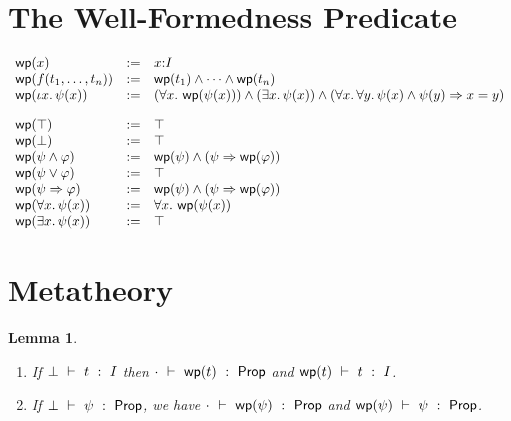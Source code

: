 \documentclass[11pt]{article}
\newtheorem{lemma}{Lemma}
\begin{document}
\section{The Well-Formedness Predicate}


\[
\begin{array}{lll}
  \mathop{\mathsf{wp}}(x) & := & x{:}I\\
  \mathop{\mathsf{wp}}(f({t}_1,\ldots,{t}_{n})) & := & \mathop{\mathsf{wp}}(t_1) \wedge \cdots \wedge \mathop{\mathsf{wp}}(t_n)\\
  \mathop{\mathsf{wp}}(\iota x.\, \psi(x)) & := &
       (\forall x.\, \mathop{\mathsf{wp}}(\psi(x))) \wedge
       (\exists x.\, \psi(x)) \wedge
       (\forall x.\, \forall y.\, \psi(x) \wedge \psi(y) \Rightarrow x=y)\\[10pt]

  \mathop{\mathsf{wp}}(\top) & := & \top\\
  \mathop{\mathsf{wp}}(\bot) & := & \top\\
  \mathop{\mathsf{wp}}(\psi \wedge \varphi) & := & \mathop{\mathsf{wp}}(\psi) \wedge (\psi \Rightarrow \mathop{\mathsf{wp}}(\varphi))\\
  \mathop{\mathsf{wp}}(\psi \vee \varphi) & := & \top\\
  \mathop{\mathsf{wp}}(\psi \Rightarrow \varphi) & := & \mathop{\mathsf{wp}}(\psi) \wedge (\psi \Rightarrow \mathop{\mathsf{wp}}(\varphi))\\
  \mathop{\mathsf{wp}}(\forall x.\, \psi(x)) & := & \forall x.\, \mathop{\mathsf{wp}}(\psi(x))\\
  \mathop{\mathsf{wp}}(\exists x.\, \psi(x)) & := & \top\\
\end{array}
\]

\section{Metatheory}

\begin{lemma}
\mbox{}
  \begin{enumerate}
  \item If $\bot\ \vdash\ t\ :\ I$ then $\cdot\ \vdash\ \mathop{\mathsf{wp}}(t)\ :\ \mathsf{Prop}$ and
    $\mathop{\mathsf{wp}}(t)\ \vdash\ t\ :\ I$.
  \item If $\bot\ \vdash\ \psi\ :\ \mathsf{Prop}$, we have
    $\cdot\ \vdash\ \mathop{\mathsf{wp}}(\psi)\ :\ \mathsf{Prop}$ and $\mathop{\mathsf{wp}}(\psi)\ \vdash\ \psi\ :\ \mathsf{Prop}$.
  \end{enumerate}
\end{lemma}
\end{document}
